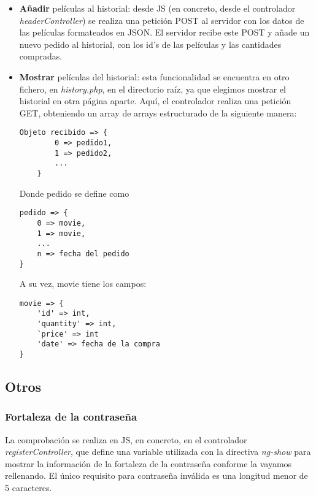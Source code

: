 \documentclass{apuntes}
\begin{document}
\begin{itemize}
\item \textbf{Añadir} películas al historial: desde JS (en concreto, desde el controlador \textit{headerController}) se realiza una petición POST al servidor con los datos de las películas formateados en JSON. El servidor recibe este POST y añade un nuevo pedido al historial, con los id's de las películas y las cantidades compradas. 

\item \textbf{Mostrar} películas del historial: esta funcionalidad se encuentra en otro fichero, en \textit{history.php}, en el directorio raíz, ya que elegimos mostrar el historial en otra página aparte. Aquí, el controlador realiza una petición GET, obteniendo un array de arrays estructurado de la siguiente manera:

\begin{verbatim}
Objeto recibido => {
		0 => pedido1,
		1 => pedido2,
		...
	}
\end{verbatim}
Donde pedido se define como 

\begin{verbatim}pedido => {
	0 => movie,
	1 => movie,
	...
	n => fecha del pedido
}
\end{verbatim}

A su vez, movie tiene los campos:

\begin{verbatim}
movie => {
	'id' => int,
	'quantity' => int,
	`price' => int
	'date' => fecha de la compra
}
\end{verbatim}



\end{itemize}

\subsection{Otros}

\subsubsection{Fortaleza de la contraseña}
\label{PasStrength}

La comprobación se realiza en JS, en concreto, en el controlador \textit{registerController}, que define una variable utilizada con la directiva \textit{ng-show} para mostrar la información de la fortaleza de la contraseña conforme la vayamos rellenando. El único requisito para contraseña inválida es una longitud menor de 5 caracteres.
\end{document}
